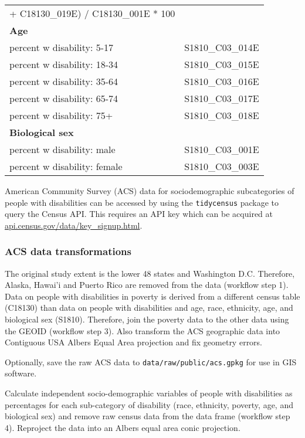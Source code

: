 \documentclass[
]{article}
\begin{document}
\begin{longtable}[]{@{}
  >{\centering\arraybackslash}p{}
  >{\centering\arraybackslash}p{}@{}}
+ C18130\_019E) / C18130\_001E * 100 \\
\textbf{Age} & \\
percent w disability: 5-17 & S1810\_C03\_014E \\
percent w disability: 18-34 & S1810\_C03\_015E \\
percent w disability: 35-64 & S1810\_C03\_016E \\
percent w disability: 65-74 & S1810\_C03\_017E \\
percent w disability: 75+ & S1810\_C03\_018E \\
\textbf{Biological sex} & \\
percent w disability: male & S1810\_C03\_001E \\
percent w disability: female & S1810\_C03\_003E \\
\end{longtable}

American Community Survey (ACS) data for sociodemographic subcategories
of people with disabilities can be accessed by using the
\texttt{tidycensus} package to query the Census API. This requires an
API key which can be acquired at
\href{https://api.census.gov/data/key_signup.html}{api.census.gov/data/key\_signup.html}.

\hypertarget{acs-data-transformations}{%
\subsubsection{ACS data
transformations}\label{acs-data-transformations}}

The original study extent is the lower 48 states and Washington D.C.
Therefore, Alaska, Hawai'i and Puerto Rico are removed from the data
(workflow step 1). Data on people with disabilities in poverty is
derived from a different census table (C18130) than data on people with
disabilities and age, race, ethnicity, age, and biological sex (S1810).
Therefore, join the poverty data to the other data using the GEOID
(workflow step 3). Also transform the ACS geographic data into
Contiguous USA Albers Equal Area projection and fix geometry errors.

Optionally, save the raw ACS data to \texttt{data/raw/public/acs.gpkg}
for use in GIS software.

Calculate independent socio-demographic variables of people with
disabilities as percentages for each sub-category of disability (race,
ethnicity, poverty, age, and biological sex) and remove raw census data
from the data frame (workflow step 4). Reproject the data into an Albers
equal area conic projection.
\end{document}
